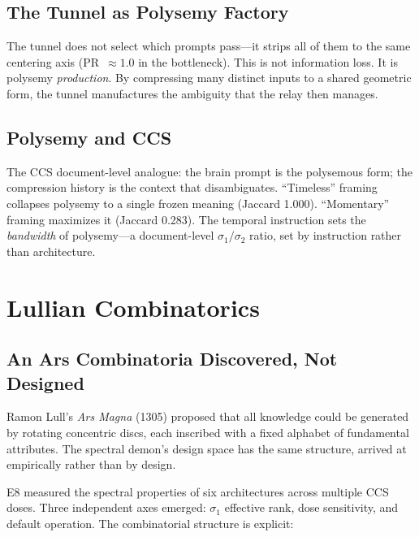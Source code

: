 \documentclass[12pt]{article}
\begin{document}
\subsection{The Tunnel as Polysemy Factory}

The tunnel does not select which prompts pass---it strips all of them to the same centering axis (PR~$\approx 1.0$ in the bottleneck). This is not information loss. It is polysemy \emph{production}. By compressing many distinct inputs to a shared geometric form, the tunnel manufactures the ambiguity that the relay then manages.

\subsection{Polysemy and CCS}

The CCS document-level analogue: the brain prompt is the polysemous form; the compression history is the context that disambiguates. ``Timeless'' framing collapses polysemy to a single frozen meaning (Jaccard 1.000). ``Momentary'' framing maximizes it (Jaccard 0.283). The temporal instruction sets the \emph{bandwidth} of polysemy---a document-level $\sigma_1/\sigma_2$ ratio, set by instruction rather than architecture.

\section{Lullian Combinatorics}
\label{sec:lullian}

\subsection{An Ars Combinatoria Discovered, Not Designed}

Ramon Lull's \emph{Ars Magna} (1305) proposed that all knowledge could be generated by rotating concentric discs, each inscribed with a fixed alphabet of fundamental attributes. The spectral demon's design space has the same structure, arrived at empirically rather than by design.

E8 measured the spectral properties of six architectures across multiple CCS doses. Three independent axes emerged: $\sigma_1$ effective rank, dose sensitivity, and default operation. The combinatorial structure is explicit:
\end{document}
